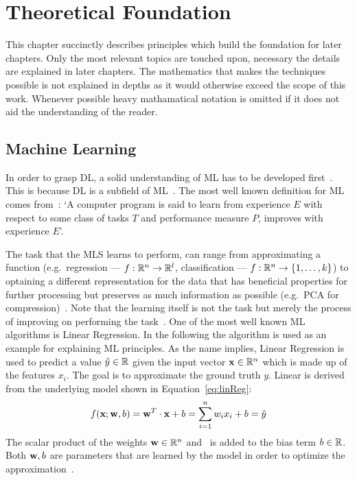 \chapter{Theoretical Foundation}\label{ch:theoretical}
This chapter succinctly describes principles which build the foundation for later chapters.
Only the most relevant topics are touched upon, necessary the details are explained in later chapters.
The mathematics that makes the techniques possible is not explained in depths as it would otherwise
exceed the scope of this work.
Whenever possible heavy mathamatical notation is omitted if it does not aid the understanding of the
reader.

\section{Machine Learning}
In order to grasp \ac{DL}, a solid understanding of \ac{ML} has to be developed
first~\citep{goodfellow_deep_2016}.
This is because \ac{DL} is a subfield of \ac{ML}~\citep{chauhan_review_2018}.
The most well known definition for \ac{ML} comes from~\cite{mitchell_machine_1997}:
`A computer program is said to learn from experience $E$ with respect to some class of tasks $T$
and performance measure $P$, improves with experience $E$'.

The task that the \ac{MLS} learns to perform, can range from approximating a function
(e.g.\ regression --- $f:\mathbb{R}^n \rightarrow \mathbb{R}^l$, classification ---
$f:\mathbb{R}^n \rightarrow \{1,\ldots,k\}$) to optaining a different representation for the data that
has beneficial properties for further processing but preserves as much information as possible
(e.g.\ PCA for compression)~\citep{goodfellow_deep_2016}.
Note that the learning itself is not the task but merely the process of improving on performing the
task~\citep{goodfellow_deep_2016}.
One of the most well known \ac{ML} algorithms is Linear Regression.
In the following the algorithm is used as an example for explaining \ac{ML} principles.
As the name implies, Linear Regression is used to predict a value $\hat{y}\in\mathbb{R}$ given the input vector
$\textbf{x}\in\mathbb{R}^n$ which is made up of the features $x_i$.
The goal is to approximate the ground truth $y$.
Linear is derived from the underlying model shown in Equation~\ref{eq:linReg}:
\begin{equation}\label{eq:linReg}
    f(\textbf{x};\textbf{w},b) = \textbf{w}^{T} \cdot \textbf{x} + b = \sum_{i=1}^{n} w_i x_i + b = \hat{y}
\end{equation}
The scalar product of the weights $\textbf{w}\in\mathbb{R}^n$ and \x\ is added to the bias term $b\in\mathbb{R}$.
Both $\textbf{w},b$ are parameters that are learned by the model in order to optimize the
approximation~\citep{goodfellow_deep_2016}.

